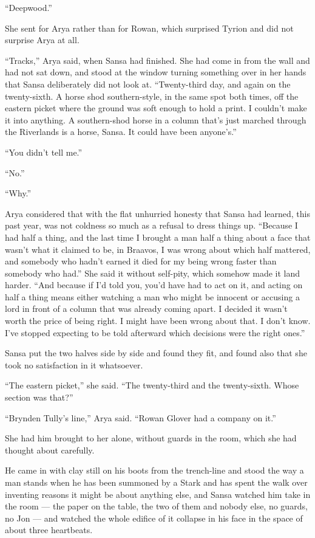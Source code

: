 “Deepwood.”

\sceneBreak

She sent for Arya rather than for Rowan, which surprised Tyrion and did not surprise Arya at all.

“Tracks,” Arya said, when Sansa had finished. She had come in from the wall and had not sat down, and stood at the window turning something over in her hands that Sansa deliberately did not look at. “Twenty-third day, and again on the twenty-sixth. A horse shod southern-style, in the same spot both times, off the eastern picket where the ground was soft enough to hold a print. I couldn’t make it into anything. A southern-shod horse in a column that’s just marched through the Riverlands is a horse, Sansa. It could have been anyone’s.”

“You didn’t tell me.”

“No.”

“Why.”

Arya considered that with the flat unhurried honesty that Sansa had learned, this past year, was not coldness so much as a refusal to dress things up. “Because I had half a thing, and the last time I brought a man half a thing about a face that wasn’t what it claimed to be, in Braavos, I was wrong about which half mattered, and somebody who hadn’t earned it died for my being wrong faster than somebody who had.” She said it without self-pity, which somehow made it land harder. “And because if I’d told you, you’d have had to act on it, and acting on half a thing means either watching a man who might be innocent or accusing a lord in front of a column that was already coming apart. I decided it wasn’t worth the price of being right. I might have been wrong about that. I don’t know. I’ve stopped expecting to be told afterward which decisions were the right ones.”

Sansa put the two halves side by side and found they fit, and found also that she took no satisfaction in it whatsoever.

“The eastern picket,” she said. “The twenty-third and the twenty-sixth. Whose section was that?”

“Brynden Tully’s line,” Arya said. “Rowan Glover had a company on it.”

\sceneBreak

She had him brought to her alone, without guards in the room, which she had thought about carefully.

He came in with clay still on his boots from the trench-line and stood the way a man stands when he has been summoned by a Stark and has spent the walk over inventing reasons it might be about anything else, and Sansa watched him take in the room — the paper on the table, the two of them and nobody else, no guards, no Jon — and watched the whole edifice of it collapse in his face in the space of about three heartbeats.

